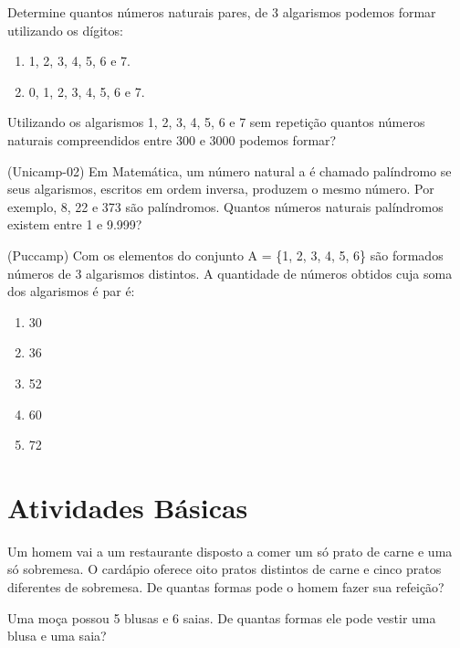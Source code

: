 		\item Determine quantos números naturais pares, de 3 algarismos podemos formar utilizando os dígitos:
		\begin{multicols}{2}
		\begin{enumerate}
		\item 1, 2, 3, 4, 5, 6 e 7.
		\item 0, 1, 2, 3, 4, 5, 6 e 7.
		\end{enumerate}
		\end{multicols}

		\item Utilizando os algarismos 1, 2, 3, 4, 5, 6 e 7 sem repetição quantos números naturais compreendidos entre 300 e 3000 podemos formar?

		\item (Unicamp-02) Em Matemática, um número natural a é chamado palíndromo se seus algarismos, escritos em ordem inversa, produzem o mesmo número. Por exemplo, 8, 22 e 373 são palíndromos. Quantos números naturais palíndromos existem entre 1 e 9.999?

		\item (Puccamp) Com os elementos do conjunto A = \{1, 2, 3, 4, 5, 6\} são formados números de 3 algarismos distintos. A quantidade de números obtidos cuja soma dos algarismos é par é:
		\begin{multicols}{5}
		\begin{enumerate}
			\item 30
			\item 36
			\item 52
			\item 60
			\item 72
		\end{enumerate}
		\end{multicols}
	
			
		\section{Atividades Básicas}				
				
		
	\item Um homem vai a um restaurante disposto a comer um só prato de carne e uma só sobremesa. O cardápio oferece oito pratos distintos de carne e cinco pratos diferentes de sobremesa. De quantas formas pode o homem fazer sua refeição?
	
	\item Uma moça possou 5 blusas e 6 saias. De quantas formas ele pode vestir uma blusa e uma saia?
	
